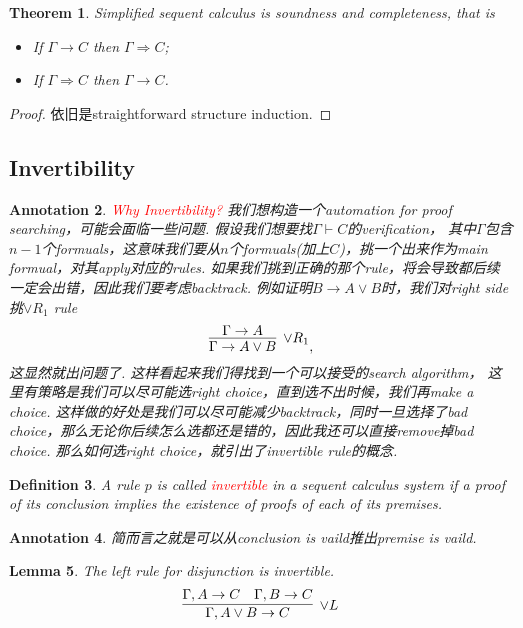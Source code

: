 \documentclass{article}
\theoremstyle{plain}
\newtheorem{theorem}{Theorem}
\newtheorem{lemma}[theorem]{Lemma}
\newtheorem{definition}[theorem]{Definition}
\newtheorem{annotation}[theorem]{Annotation}
\theoremstyle{nonumberplain}
\newtheorem{proof}{Proof}
\newcommand{\redt}[1]{\textcolor{red}{#1}}
\begin{document}
\begin{theorem}
\rm Simplified sequent calculus is soundness and completeness, that is
\begin{itemize}
	\item If $\Gamma \to C$ then $\Gamma \Rightarrow C$;
	\item If $\Gamma \Rightarrow C$ then $\Gamma \to C$.
\end{itemize}
\end{theorem}

\begin{proof}
依旧是straightforward structure induction.
\end{proof}



\newpage
\subsection{Invertibility}\label{invertible calculus}	

\begin{annotation}
 \rm \redt{Why Invertibility?} \cite{15-317-inv} 我们想构造一个automation for proof searching，可能会面临一些问题. 假设我们想要找$\Gamma \vdash C$的verification， 其中$\Gamma$包含$n-1$个formuals，这意味我们要从$n$个formuals(加上$C$)，挑一个出来作为main formual，对其apply对应的rules. 如果我们挑到正确的那个rule，将会导致都后续一定会出错，因此我们要考虑backtrack. 例如证明$B \to A \vee B$时，我们对right side挑$\vee R_1$ rule
$$
\infer[\vee R_1]{\Gamma \to A \vee B}{\Gamma \to A},
$$ 
这显然就出问题了. 这样看起来我们得找到一个可以接受的search algorithm， 这里有策略是我们可以尽可能选right choice，直到选不出时候，我们再make a choice. 这样做的好处是我们可以尽可能减少backtrack，同时一旦选择了bad choice，那么无论你后续怎么选都还是错的，因此我还可以直接remove掉bad choice. 那么如何选right choice，就引出了invertible rule的概念. 
\end{annotation}

\begin{definition}
\rm A rule $p$ is called \redt{invertible} in a sequent calculus system if a proof of its conclusion implies the existence of proofs of each of its premises. 
\end{definition}

\begin{annotation}
\rm 简而言之就是可以从conclusion is vaild推出premise is vaild.
\end{annotation}

\begin{lemma}
\rm The left rule for disjunction is invertible.
$$
\infer[\vee L]{\Gamma, A \vee B \to C}{\Gamma, A \to C & \Gamma, B \to C}
$$
\end{lemma}
\end{document}
